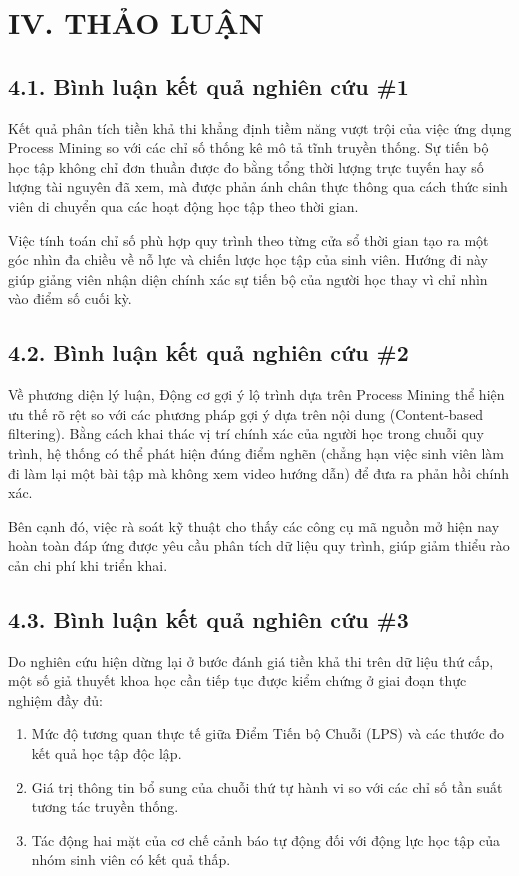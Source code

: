 \section{IV. THẢO LUẬN}

\subsection{4.1. Bình luận kết quả nghiên cứu \#1}
Kết quả phân tích tiền khả thi khẳng định tiềm năng vượt trội của việc ứng dụng Process Mining so với các chỉ số thống kê mô tả tĩnh truyền thống. Sự tiến bộ học tập không chỉ đơn thuần được đo bằng tổng thời lượng trực tuyến hay số lượng tài nguyên đã xem, mà được phản ánh chân thực thông qua cách thức sinh viên di chuyển qua các hoạt động học tập theo thời gian.

Việc tính toán chỉ số phù hợp quy trình theo từng cửa sổ thời gian tạo ra một góc nhìn đa chiều về nỗ lực và chiến lược học tập của sinh viên. Hướng đi này giúp giảng viên nhận diện chính xác sự tiến bộ của người học thay vì chỉ nhìn vào điểm số cuối kỳ.

\subsection{4.2. Bình luận kết quả nghiên cứu \#2}
Về phương diện lý luận, Động cơ gợi ý lộ trình dựa trên Process Mining thể hiện ưu thế rõ rệt so với các phương pháp gợi ý dựa trên nội dung (Content-based filtering). Bằng cách khai thác vị trí chính xác của người học trong chuỗi quy trình, hệ thống có thể phát hiện đúng điểm nghẽn (chẳng hạn việc sinh viên làm đi làm lại một bài tập mà không xem video hướng dẫn) để đưa ra phản hồi chính xác.

Bên cạnh đó, việc rà soát kỹ thuật cho thấy các công cụ mã nguồn mở hiện nay hoàn toàn đáp ứng được yêu cầu phân tích dữ liệu quy trình, giúp giảm thiểu rào cản chi phí khi triển khai.

\subsection{4.3. Bình luận kết quả nghiên cứu \#3}
Do nghiên cứu hiện dừng lại ở bước đánh giá tiền khả thi trên dữ liệu thứ cấp, một số giả thuyết khoa học cần tiếp tục được kiểm chứng ở giai đoạn thực nghiệm đầy đủ:
\begin{enumerate}
    \item Mức độ tương quan thực tế giữa Điểm Tiến bộ Chuỗi (LPS) và các thước đo kết quả học tập độc lập.
    \item Giá trị thông tin bổ sung của chuỗi thứ tự hành vi so với các chỉ số tần suất tương tác truyền thống.
    \item Tác động hai mặt của cơ chế cảnh báo tự động đối với động lực học tập của nhóm sinh viên có kết quả thấp.
\end{enumerate}

